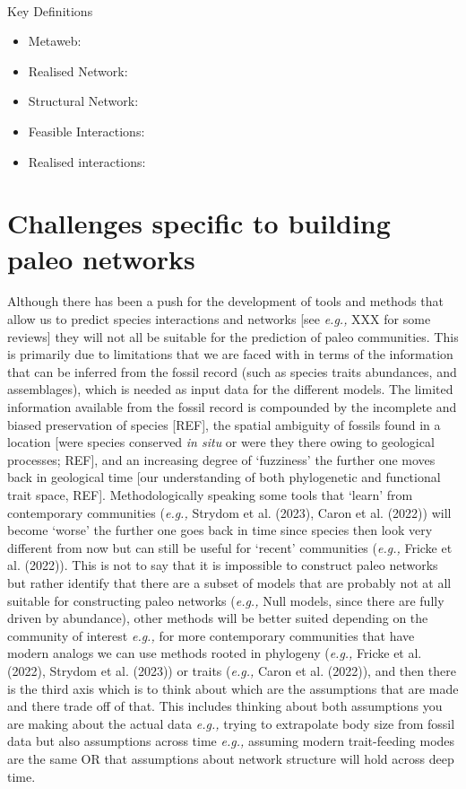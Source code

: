 \documentclass[
]{article}
\makeatletter
\let\oldparagraph\paragraph
\renewcommand{\paragraph}{
    \@ifstar
      \xxxParagraphStar
      \xxxParagraphNoStar
  }
\newcommand{\xxxParagraphStar}[1]{\oldparagraph*{#1}\mbox{}}
\newcommand{\xxxParagraphNoStar}[1]{\oldparagraph{#1}\mbox{}}
\providecommand{\tightlist}{%
  \setlength{\itemsep}{0pt}\setlength{\parskip}{0pt}}
\makeatother
\begin{document}
\paragraph{Key Definitions}\label{key-definitions}

\begin{itemize}
\tightlist
\item
  Metaweb:
\item
  Realised Network:
\item
  Structural Network:
\item
  Feasible Interactions:
\item
  Realised interactions:
\end{itemize}

\section{Challenges specific to building paleo
networks}\label{challenges-specific-to-building-paleo-networks}

Although there has been a push for the development of tools and methods
that allow us to predict species interactions and networks {[}see
\emph{e.g.,} XXX for some reviews{]} they will not all be suitable for
the prediction of paleo communities. This is primarily due to
limitations that we are faced with in terms of the information that can
be inferred from the fossil record (such as species traits abundances,
and assemblages), which is needed as input data for the different
models. The limited information available from the fossil record is
compounded by the incomplete and biased preservation of species
{[}REF{]}, the spatial ambiguity of fossils found in a location {[}were
species conserved \emph{in situ} or were they there owing to geological
processes; REF{]}, and an increasing degree of `fuzziness' the further
one moves back in geological time {[}our understanding of both
phylogenetic and functional trait space, REF{]}. Methodologically
speaking some tools that `learn' from contemporary communities
(\emph{e.g.,} Strydom et al. (2023), Caron et al. (2022)) will become
`worse' the further one goes back in time since species then look very
different from now but can still be useful for `recent' communities
(\emph{e.g.,} Fricke et al. (2022)). This is not to say that it is
impossible to construct paleo networks but rather identify that there
are a subset of models that are probably not at all suitable for
constructing paleo networks (\emph{e.g.,} Null models, since there are
fully driven by abundance), other methods will be better suited
depending on the community of interest \emph{e.g.,} for more
contemporary communities that have modern analogs we can use methods
rooted in phylogeny (\emph{e.g.,} Fricke et al. (2022), Strydom et al.
(2023)) or traits (\emph{e.g.,} Caron et al. (2022)), and then there is
the third axis which is to think about which are the assumptions that
are made and there trade off of that. This includes thinking about both
assumptions you are making about the actual data \emph{e.g.,} trying to
extrapolate body size from fossil data but also assumptions across time
\emph{e.g.,} assuming modern trait-feeding modes are the same OR that
assumptions about network structure will hold across deep time.
\end{document}
